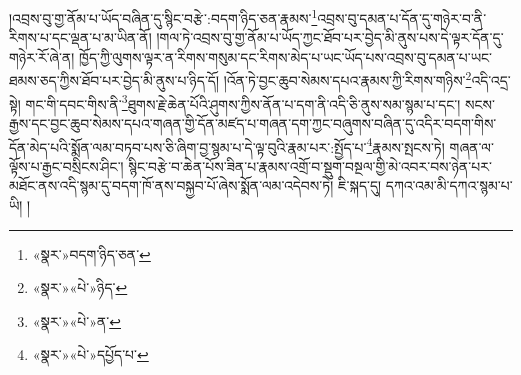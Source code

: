།འབྲས་བུ་གྱ་ནོམ་པ་ཡོད་བཞིན་དུ་སྙིང་བརྩེ་:བདག་ཉིད་ཅན་རྣམས་\footnote{«སྣར་»བདག་ཉིད་ཅན་}འབྲས་བུ་དམན་པ་དོན་དུ་གཉེར་བ་ནི་རིགས་པ་དང་ལྡན་པ་མ་ཡིན་ནོ། །གལ་ཏེ་འབྲས་བུ་གྱ་ནོམ་པ་ཡོད་ཀྱང་ཐོབ་པར་བྱེད་མི་ནུས་པས་དེ་ལྟར་དོན་དུ་གཉེར་རོ་ཞེ་ན། ཁྱོད་ཀྱི་ལུགས་ལྟར་ན་རིགས་གསུམ་དང་རིགས་མེད་པ་ཡང་ཡོད་པས་འབྲས་བུ་དམན་པ་ཡང་ཐམས་ཅད་ཀྱིས་ཐོབ་པར་བྱེད་མི་ནུས་པ་ཉིད་དོ། །འོན་ཏེ་བྱང་ཆུབ་སེམས་དཔའ་རྣམས་ཀྱི་རིགས་གཉིས་\footnote{«སྣར་»«པེ་»ཉིད་}འདི་འདྲ་སྟེ། གང་གི་དབང་གིས་ནི་\footnote{«སྣར་»«པེ་»ན་}ཐུགས་རྗེ་ཆེན་པོའི་ཤུགས་ཀྱིས་ནོན་པ་དག་ནི་འདི་ཅི་ནུས་སམ་སྙམ་པ་དང་། སངས་རྒྱས་དང་བྱང་ཆུབ་སེམས་དཔའ་གཞན་གྱི་དོན་མཛད་པ་གཞན་དག་ཀྱང་བཞུགས་བཞིན་དུ་འདིར་བདག་གིས་དོན་མེད་པའི་སྨོན་ལམ་བཏབ་པས་ཅི་ཞིག་བྱ་སྙམ་པ་དེ་ལྟ་བུའི་རྣམ་པར་:སྤྱོད་པ་\footnote{«སྣར་»«པེ་»དཔྱོད་པ་}རྣམས་སྤངས་ཏེ། གཞན་ལ་ལྟོས་པ་རྒྱང་བསྲིངས་ཤིང་། སྙིང་བརྩེ་བ་ཆེན་པོས་ཟིན་པ་རྣམས་འགྲོ་བ་སྡུག་བསྔལ་གྱི་མེ་འབར་བས་ཉེན་པར་མཐོང་ནས་འདི་སྙམ་དུ་བདག་ཁོ་ནས་བསྐྱབ་པོ་ཞེས་སྨོན་ལམ་འདེབས་ཏེ། ཇི་སྐད་དུ། དཀའ་འམ་མི་དཀའ་སྙམ་པ་ཡི། །
